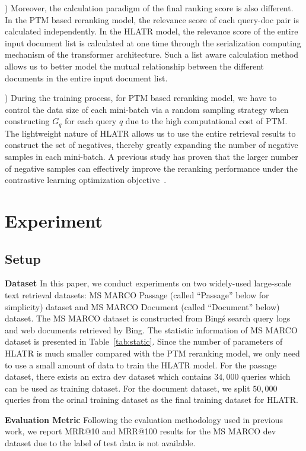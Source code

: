 \documentclass[11pt]{article}
\begin{document}
) Moreover, the calculation paradigm of the final ranking score is also different. In the PTM based reranking model, the relevance score of each query-doc pair is calculated independently. In the HLATR model, the relevance score of the entire input document list is calculated at one time through the serialization computing mechanism of the transformer architecture. Such a list aware calculation method allows us to better model the mutual relationship between the different documents in the entire input document list.

) During the training process, for PTM based reranking model, we have to control the data size of each mini-batch via a random sampling strategy when constructing $G_q$ for each query $q$ due to the high computational cost of PTM. The lightweight nature of HLATR allows us to use the entire retrieval results to construct the set of negatives, thereby greatly expanding the number of negative samples in each mini-batch. A previous study has proven that the larger number of negative samples can effectively improve the reranking performance under the contrastive learning optimization objective~\cite{gao2021rethink}.

\section{Experiment}
\subsection{Setup}

\noindent \textbf{Dataset} In this paper, we conduct experiments on two widely-used large-scale text retrieval datasets: MS MARCO Passage (called ``Passage'' below for simplicity) dataset and MS MARCO Document (called ``Document'' below) dataset. The MS MARCO dataset is constructed from Bing\'s search query logs and web documents retrieved by Bing. The statistic information of MS MARCO dataset is presented in Table~\ref{tab:static}. Since the number of parameters of HLATR is much smaller compared with the PTM reranking model, we only need to use a small amount of data to train the HLATR model. For the passage dataset, there exists an extra dev dataset which contains $34,000$ queries which can be used as training dataset. For the document dataset, we split $50,000$ queries from the orinal training dataset as the final training dataset for HLATR.

\vspace{0.15cm}
\noindent \textbf{Evaluation Metric} Following the evaluation methodology used in previous work, we report MRR@10 and MRR@100 results for the MS MARCO dev dataset due to the label of test data is not available. 
\end{document}

